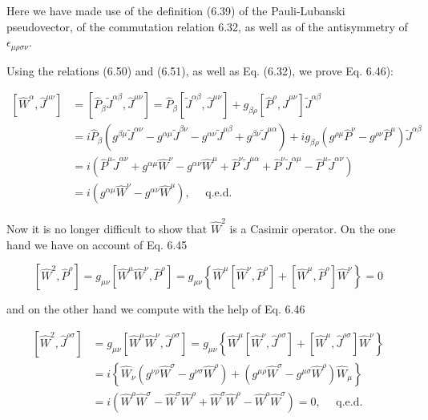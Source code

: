\documentclass[10pt, letterpaper]{article}
\begin{document}
Here we have made use of the definition (6.39) of the Pauli-Lubanski pseudovector, of the commutation relation 6.32, as well as of the antisymmetry of $\epsilon_{\mu \rho \sigma \nu}$.

Using the relations (6.50) and (6.51), as well as Eq. (6.32), we prove Eq. 6.46):

$$
\begin{aligned}
{\left[\hat{W}^{\alpha}, \hat{J}^{\mu \nu}\right] } & =\left[\hat{P}_{\beta} \tilde{J}^{\alpha \beta}, \hat{J}^{\mu \nu}\right]=\hat{P}_{\beta}\left[\tilde{J}^{\alpha \beta}, \hat{J}^{\mu \nu}\right]+g_{\beta \rho}\left[\hat{P}^{\rho}, \hat{J}^{\mu \nu}\right] \tilde{J}^{\alpha \beta} \\
& =i \hat{P}_{\beta}\left(g^{\beta \mu} \tilde{J}^{\alpha \nu}-g^{\alpha \mu} \tilde{J}^{\beta \nu}-g^{\alpha \nu} \tilde{J}^{\mu \beta}+g^{\beta \nu} \tilde{J}^{\mu \alpha}\right)+i g_{\beta \rho}\left(g^{\rho \mu} \hat{P}^{\nu}-g^{\rho \nu} \hat{P}^{\mu}\right) \tilde{J}^{\alpha \beta} \\
& =i\left(\hat{P}^{\mu} \tilde{J}^{\alpha \nu}+g^{\alpha \mu} \hat{W}^{\nu}-g^{\alpha \nu} \hat{W}^{\mu}+\hat{P}^{\nu} \tilde{J}^{\mu \alpha}+\hat{P}^{\nu} \tilde{J}^{\alpha \mu}-\hat{P}^{\mu} \tilde{J}^{\alpha \nu}\right) \\
& =i\left(g^{\alpha \mu} \hat{W}^{\nu}-g^{\alpha \nu} \hat{W}^{\mu}\right), \quad \text { q.e.d. }
\end{aligned}
$$

Now it is no longer difficult to show that $\hat{W}^{2}$ is a Casimir operator. On the one hand we have on account of Eq. 6.45

$$
\left[\hat{W}^{2}, \hat{P}^{\rho}\right]=g_{\mu \nu}\left[\hat{W}^{\mu} \hat{W}^{\nu}, \hat{P}^{\rho}\right]=g_{\mu \nu}\left\{\hat{W}^{\mu}\left[\hat{W}^{\nu}, \hat{P}^{\rho}\right]+\left[\hat{W}^{\mu}, \hat{P}^{\rho}\right] \hat{W}^{\nu}\right\}=0
$$

and on the other hand we compute with the help of Eq. 6.46

$$
\begin{aligned}
{\left[\hat{W}^{2}, \hat{J}^{\rho \sigma}\right] } & =g_{\mu \nu}\left[\hat{W}^{\mu} \hat{W}^{\nu}, \hat{J}^{\rho \sigma}\right]=g_{\mu \nu}\left\{\hat{W}^{\mu}\left[\hat{W}^{\nu}, \hat{J}^{\rho \sigma}\right]+\left[\hat{W}^{\mu}, \hat{J}^{\rho \sigma}\right] \hat{W}^{\nu}\right\} \\
& =i\left\{\hat{W}_{\nu}\left(g^{\nu \rho} \hat{W}^{\sigma}-g^{\nu \sigma} \hat{W}^{\rho}\right)+\left(g^{\mu \rho} \hat{W}^{\sigma}-g^{\mu \sigma} \hat{W}^{\rho}\right) \hat{W}_{\mu}\right\} \\
& =i\left(\hat{W}^{\rho} \hat{W}^{\sigma}-\hat{W}^{\sigma} \hat{W}^{\rho}+\hat{W}^{\sigma} \hat{W}^{\rho}-\hat{W}^{\rho} \hat{W}^{\sigma}\right)=0, \quad \text { q.e.d. }
\end{aligned}
$$
\end{document}
